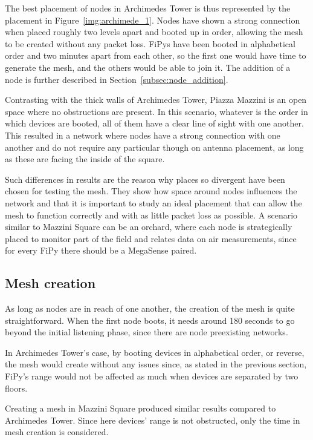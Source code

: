 			The best placement of nodes in Archimedes Tower is thus represented by the placement in Figure~\ref{img:archimede_1}.
			Nodes have shown a strong connection when placed roughly two levels apart and booted up in order, allowing the mesh to be created without any packet loss.
			FiPys have been booted in alphabetical order and two minutes apart from each other, so the first one would have time to generate the mesh, and the others would be able to join it.
			The addition of a node is further described in Section~\ref{subsec:node_addition}.
			
			Contrasting with the thick walls of Archimedes Tower, Piazza Mazzini is an open space where no obstructions are present.
			In this scenario, whatever is the order in which devices are booted, all of them have a clear line of sight with one another.
			This resulted in a network where nodes have a strong connection with one another and do not require any particular though on antenna placement, as long as these are facing the inside of the square.
			
			Such differences in results are the reason why places so divergent have been chosen for testing the mesh.
			They show how space around nodes influences the network and that it is important to study an ideal placement that can allow the mesh to function correctly and with as little packet loss as possible.
			A scenario similar to Mazzini Square can be an orchard, where each node is strategically placed to monitor part of the field and relates data on air measurements, since for every FiPy there should be a MegaSense paired.
			
		\subsection{Mesh creation}
		
			As long as nodes are in reach of one another, the creation of the mesh is quite straightforward.
			When the first node boots, it needs around 180 seconds to go beyond the initial listening phase, since there are node preexisting networks.
			
			In Archimedes Tower's case, by booting devices in alphabetical order, or reverse, the mesh would create without any issues since, as stated in the previous section, FiPy's range would not be affected as much when devices are separated by two floors. 
			
			Creating a mesh in Mazzini Square produced similar results compared to Archimedes Tower.
			Since here devices' range is not obstructed, only the time in mesh creation is considered.
			
